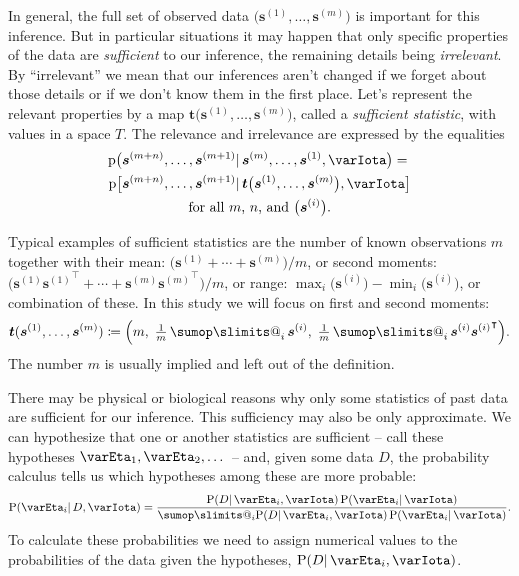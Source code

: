 \documentclass[\ifafour a4paper,12pt,\else a5paper,10pt,\fi%
onecolumn,oneside,article,%
british%
]{memoir}
\makeatletter
\theoremstyle{remark}
\theoremstyle{innote}
\def\sum{\DOTSI\sumop\slimits@}
\newcommand*{\defd}{\coloneqq}
\newcommand*{\pf}{\mathrm{p}}%
\newcommand*{\p}{\mathrm{P}}%
\renewcommand*{\|}{\mathpunct{|}}
\newcommand*{\tsum}{\mathop{\textstyle\sum}\nolimits}
\newcommand*{\T}{^\intercal}%
\newcommand*{\yI}{\varIota}
\newcommand*{\ys}{\bm{s}}
\newcommand*{\yt}{\bm{t}}
\newcommand*{\yso}[1]{\ys^{(#1)}}
\newcommand*{\yH}{\varEta}
\newcommand*{\yD}{D}
\makeatother
\begin{document}
In general, the full set of observed data
$\bigl(\yso{1}, \dotsc, \yso{m}\bigr)$ is important for this inference. But
in particular situations it may happen that only specific properties of the
data are \emph{sufficient} to our inference, the remaining details being
\emph{irrelevant}. By \enquote{irrelevant} we mean that our inferences
aren't changed if we forget about those details or if we don't know them in
the first place. Let's represent the relevant properties by a map
$\yt\bigl(\yso{1},\dotsc,\yso{m}\bigr)$, called a \emph{sufficient
  statistic}, with values in a space $T$. The relevance and irrelevance
are expressed by the equalities
\begin{multline}
  \label{eq:predictive_sufficiency}
  \pf\bigl(\yso{m+n}, \dotsc, \yso{m+1}
  \| \yso{m}, \dotsc, \yso{1}, \yI\bigr)
  ={}\\
  \pf\bigl[\yso{m+n}, \dotsc, \yso{m+1}
  \| \yt\bigl(\yso{1}, \dotsc, \yso{m}\bigr), \yI\bigr]
  \\
  \text{for all $m$, $n$, and $\bigl(\yso{i}\bigr)$.}
\end{multline}

Typical examples of sufficient statistics are the number of known
observations $m$ together with their mean:
$\bigl(\yso{1} + \dotsb + \yso{m}\bigr)/m$, or second moments:
$\bigl(\yso{1}{\yso{1}}\T + \dotsb + \yso{m}{\yso{m}}\T\bigl)/m$, or range:
$\max_i\bigl(\yso{i}\bigr)-\min_i\bigl(\yso{i}\bigr)$, or combination of
these. In this study we will focus on first and second moments:
\begin{equation}
  \label{eq:example_mean_suffstat}
  \yt(\yso{1}, \dotsc, \yso{m}) \defd
  \Bigl( m,\; \tfrac{1}{m}\tsum_i \yso{i}, \;
\tfrac{1}{m}\tsum_i\yso{i}{\yso{i}}\T
  \Bigr).
\end{equation}
The number $m$ is usually implied and left out of the definition.

There may be physical or biological reasons why only some statistics of
past data are sufficient for our inference. This sufficiency may also be
only approximate. We can hypothesize that one or another statistics are
sufficient -- call these hypotheses $\yH_1, \yH_2,\dotsc$ -- and, given
some data $\yD$, the probability calculus tells us which hypotheses among
these are more probable:
\begin{equation}
  \label{eq:example_mean_suffstat}
  \p(\yH_i \| \yD, \yI) =
  \frac{\p(\yD \| \yH_i, \yI)\, \p(\yH_i\|\yI)}{
    \sum_i\p(\yD \| \yH_i, \yI)\, \p(\yH_i\|\yI)
  }.
\end{equation}
To calculate these probabilities we need to assign numerical values to the
probabilities of the data given the hypotheses, $\p(\yD \| \yH_i, \yI)$.
\end{document}

